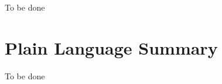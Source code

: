\documentclass[draft]{agujournal2019} %
\begin{document}
			
			
			
			
				
				\begin{abstract}
                   
				\end{abstract}
                To be done



    
				\section*{Plain Language Summary}
				To be done
				
\end{document}
